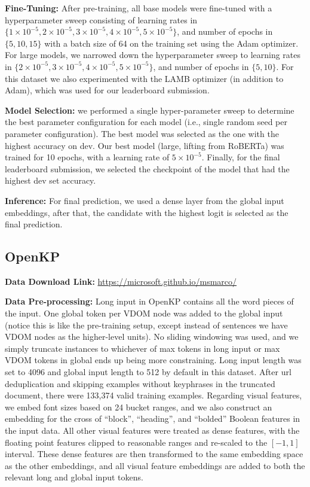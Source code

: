 \documentclass[11pt,a4paper]{article}
\begin{document}
{\bf Fine-Tuning:} After pre-training, all base models were fine-tuned with a hyperparameter sweep consisting of learning rates in $\{1\times10^{-5}, 2\times10^{-5}, 3\times10^{-5}, 4\times10^{-5},  5\times10^{-5}\}$, and number of epochs in $\{5, 10, 15\}$ with a batch size of 64 on the training set using the Adam optimizer. For large models, we narrowed down the hyperparameter sweep to learning rates in $\{2\times10^{-5}, 3\times10^{-5}, 4\times10^{-5},  5\times10^{-5}\}$, and number of epochs in $\{5, 10\}$. For this dataset we also experimented with the LAMB optimizer (in addition to Adam), which was used for our leaderboard submission. 

{\bf Model Selection:} we performed a single hyper-parameter sweep to determine the best parameter configuration for each model (i.e., single random seed per parameter configuration). The best model was selected as the one with the highest accuracy on dev. Our best model (large, lifting from RoBERTa) was trained for 10 epochs, with a learning rate of $5\times10^{-5}$. Finally, for the final leaderboard submission, we selected the checkpoint of the model that had the highest dev set accuracy.


{\bf Inference:} For final prediction, we used a dense layer from the global input embeddings, after that, the candidate with the highest logit is selected as the final prediction.


\subsection*{OpenKP} 

{\bf Data Download Link:} \url{https://microsoft.github.io/msmarco/}


{\bf Data Pre-processing:} Long input in OpenKP contains all the word pieces of the input. One global token per VDOM node was added to the global input (notice this is like the pre-training setup, except instead of sentences we have VDOM nodes as the higher-level units). No sliding windowing was used, and we simply truncate instances to whichever of max tokens in long input or max VDOM tokens in global ends up being more constraining. Long input length was set to 4096 and global input length to 512 by default in this dataset. After url deduplication and skipping examples without keyphrases in the truncated document, there were 133,374 valid training examples. Regarding visual features, we embed font sizes based on 24 bucket ranges, and we also construct an embedding for the cross of ``block'', ``heading'', and ``bolded'' Boolean features in the input data.  All other visual features were treated as dense features, with the floating point features clipped to reasonable ranges and re-scaled to the $[-1, 1]$ interval.  These dense features are then transformed to the same embedding space as the other embeddings, and all visual feature embeddings are added to both the relevant long and global input tokens. 
\end{document}
